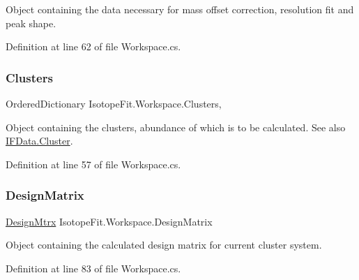Object containing the data necessary for mass offset correction, resolution fit and peak shape. 



Definition at line 62 of file Workspace.\+cs.

\mbox{\label{class_isotope_fit_1_1_workspace_a13958fbe0adace21990cb1eabbd421e9}} 
\subsubsection{\texorpdfstring{Clusters}{Clusters}}
{\footnotesize\ttfamily Ordered\+Dictionary Isotope\+Fit.\+Workspace.\+Clusters\hspace{0.3cm}{\ttfamily [get]}, {\ttfamily [set]}}



Object containing the clusters, abundance of which is to be calculated. See also \hyperlink{class_isotope_fit_1_1_i_f_data_1_1_cluster}{I\+F\+Data.\+Cluster}. 



Definition at line 57 of file Workspace.\+cs.

\mbox{\label{class_isotope_fit_1_1_workspace_ae24a2ee8f965fb2ed7ad3a592163271d}} 
\subsubsection{\texorpdfstring{Design\+Matrix}{DesignMatrix}}
{\footnotesize\ttfamily \hyperlink{class_isotope_fit_1_1_workspace_1_1_design_mtrx}{Design\+Mtrx} Isotope\+Fit.\+Workspace.\+Design\+Matrix\hspace{0.3cm}{\ttfamily [get]}}



Object containing the calculated design matrix for current cluster system. 



Definition at line 83 of file Workspace.\+cs.

\mbox{\label{class_isotope_fit_1_1_workspace_a54c0025eccacbf519f619ef256414a92}} 
